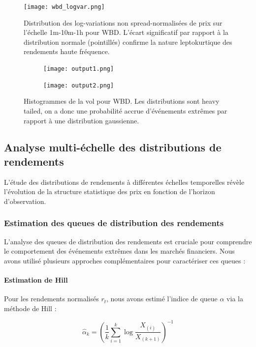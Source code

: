 \documentclass[10pt,a4paper]{article}
\theoremstyle{definition}
\theoremstyle{remark}
\begin{document}
\begin{itemize}
\begin{figure}[h!]
    \centering
        \texttt{[image: wbd\_logvar.png]}
    \caption{Distribution des log-variations non spread-normalisées de prix sur l'échelle 1m-10m-1h pour WBD. L'écart significatif par rapport à la distribution normale (pointillés) confirme la nature leptokurtique des rendements haute fréquence.}
    \label{fig:log_variations_wbd}
\end{figure}
\begin{figure}[h!]
    \centering
    \begin{subfigure}[b]{0.48\textwidth}
        \texttt{[image: output1.png]}
    \end{subfigure}
    \hfill
    \begin{subfigure}[b]{0.48\textwidth}
        \texttt{[image: output2.png]}
    \end{subfigure}
    \caption{Histogrammes de la vol pour WBD. Les distributions sont heavy tailed, on a donc une probabilité accrue d'événements extrêmes par rapport à une distribution gaussienne.}
    \label{fig:volatility_hist}
\end{figure}


\subsection{Analyse multi-échelle des distributions de rendements}

L'étude des distributions de rendements à différentes échelles temporelles révèle l'évolution de la structure statistique des prix en fonction de l'horizon d'observation.

\subsubsection{Estimation des queues de distribution des rendements}

L'analyse des queues de distribution des rendements est cruciale pour comprendre le comportement des événements extrêmes dans les marchés financiers. Nous avons utilisé plusieurs approches complémentaires pour caractériser ces queues :

\paragraph{Estimation de Hill}
Pour les rendements normalisés $r_t$, nous avons estimé l'indice de queue $\alpha$ via la méthode de Hill :

\begin{equation}
\hat{\alpha}_k = \left(\frac{1}{k} \sum_{i=1}^k \log \frac{X_{(i)}}{X_{(k+1)}}\right)^{-1}
\end{equation}


\end{itemize}
\end{document}
